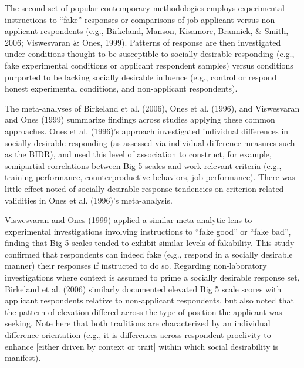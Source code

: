\documentclass[
  english,
  ,jou]{apa6}
\begin{document}
The second set of popular contemporary methodologies employs experimental instructions to \enquote{fake} responses or comparisons of job applicant versus non-applicant respondents (e.g., Birkeland, Manson, Kisamore, Brannick, \& Smith, 2006; Viswesvaran \& Ones, 1999). Patterns of response are then investigated under conditions thought to be susceptible to socially desirable responding (e.g., fake experimental conditions or applicant respondent samples) versus conditions purported to be lacking socially desirable influence (e.g., control or respond honest experimental conditions, and non-applicant respondents).

The meta-analyses of Birkeland et al. (2006), Ones et al. (1996), and Viswesvaran and Ones (1999) summarize findings across studies applying these common approaches. Ones et al. (1996)'s approach investigated individual differences in socially desirable responding (as assessed via individual difference measures such as the BIDR), and used this level of association to construct, for example, semipartial correlations between Big 5 scales and work-relevant criteria (e.g., training performance, counterproductive behaviors, job performance). There was little effect noted of socially desirable response tendencies on criterion-related validities in Ones et al. (1996)'s meta-analysis.

Viswesvaran and Ones (1999) applied a similar meta-analytic lens to experimental investigations involving instructions to \enquote{fake good} or \enquote{fake bad}, finding that Big 5 scales tended to exhibit similar levels of fakability. This study confirmed that respondents can indeed fake (e.g., respond in a socially desirable manner) their responses if instructed to do so. Regarding non-laboratory investigations where context is assumed to prime a socially desirable response set, Birkeland et al. (2006) similarly documented elevated Big 5 scale scores with applicant respondents relative to non-applicant respondents, but also noted that the pattern of elevation differed across the type of position the applicant was seeking. Note here that both traditions are characterized by an individual difference orientation (e.g., it is differences across respondent proclivity to enhance {[}either driven by context or trait{]} within which social desirability is manifest).
\end{document}
